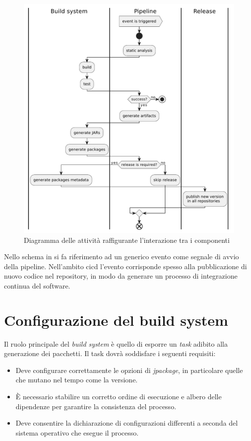 \begin{figure}[htb]
	\centering
	\includegraphics[width=.9\linewidth]{figures/activity-interaction-diagram.pdf}
	\caption{Diagramma delle attività raffigurante l'interazione tra i componenti}
	\label{fig:activity-interaction-diagram}
\end{figure}

Nello schema in  si fa riferimento ad un generico evento come segnale di avvio della pipeline. Nell'ambito \ac{cicd} l'evento corrisponde spesso alla pubblicazione di nuovo codice nel repository, in modo da generare un processo di integrazione continua del software.

\section{Configurazione del build system}

Il ruolo principale del \textit{build system} è quello di esporre un \textit{task} adibito alla generazione dei pacchetti. Il task dovrà soddisfare i seguenti requisiti:
\begin{itemize}
	\item Deve configurare correttamente le opzioni di \textit{jpackage}, in particolare quelle che mutano nel tempo come la versione.
	\item È necessario stabilire un corretto ordine di esecuzione e albero delle dipendenze per garantire la consistenza del processo.
	\item Deve consentire la dichiarazione di configurazioni differenti a seconda del sistema operativo che esegue il processo.
\end{itemize}


